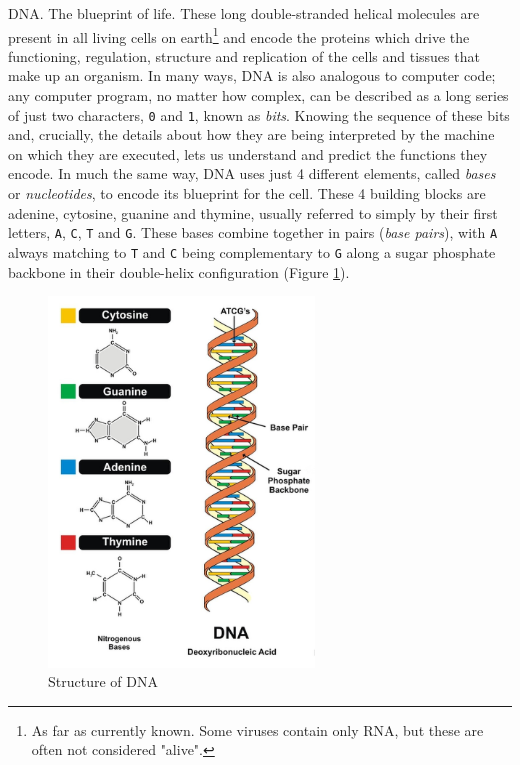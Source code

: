 DNA. The blueprint of life. These long double-stranded helical molecules are present in all living cells on earth\footnote{As far as currently known. Some viruses contain only RNA, but these are often not considered "alive".} and encode the proteins which drive the functioning, regulation, structure and replication of the cells and tissues that make up an organism. In many ways, DNA is also analogous to computer code; any computer program, no matter how complex, can be described as a long series of just two characters, \verb+0+ and \verb+1+, known as \emph{bits}. Knowing the sequence of these bits and, crucially, the details about how they are being interpreted by the machine on which they are executed, lets us understand and predict the functions they encode. In much the same way, DNA uses just 4 different elements, called \emph{bases} or \emph{nucleotides}, to encode its blueprint for the cell. These 4 building blocks are adenine, cytosine, guanine and thymine, usually referred to simply by their first letters, \verb+A+, \verb+C+, \verb+T+ and \verb+G+. These bases combine together in pairs (\emph{base pairs}), with \verb+A+ always matching to \verb+T+ and \verb+C+ being complementary to \verb+G+ along a sugar phosphate backbone in their double-helix configuration (Figure \ref{fig:dnastructure}).

\begin{figure}
    \centering
    \includegraphics[width=200pt]{chapters/images/introduction/dna-structure.png}
    \caption{Structure of DNA}
    \label{fig:dnastructure}
\end{figure}

